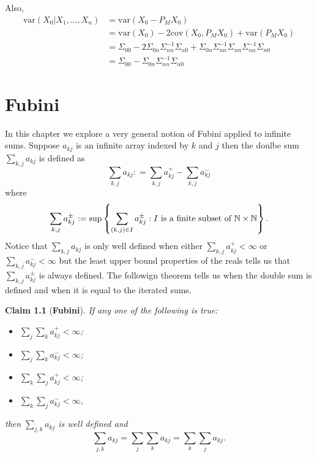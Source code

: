\documentclass[11pt]{report}
\newtheorem{claim}{Claim}
\begin{document}
Also,
\begin{align*}
\text{var}(X_0|X_1,\ldots, X_n)&= \text{var}(X_0- P_MX_0) \\
& = \text{var}(X_0) - 2\text{cov}(X_0, P_MX_0) +  \text{var}(P_MX_0) \\
& = \Sigma_{00} - 2 \Sigma_{0n}\Sigma_{nn}^{-1}\Sigma_{n0} +\Sigma_{0n}\Sigma_{nn}^{-1}\Sigma_{nn}\Sigma_{nn}^{-1}\Sigma_{n0}\\
& = \Sigma_{00} -  \Sigma_{0n}\Sigma_{nn}^{-1}\Sigma_{n0}
\end{align*}

\chapter{Fubini}


In this chapter we explore a very general notion of Fubini applied to infinite sums. Suppose $a_{kj}$ is an infinite array indexed by $k$ and $j$ then the doulbe sum $\sum_{k,j} a_{kj}$ is defined as 
\[ \sum_{k,j} a_{kj}: = \sum_{k,j} a_{kj}^+ - \sum_{k,j} a_{kj}^-\]
where
\[\sum_{k,j} a_{kj}^{\pm} := \sup \left\{ \sum_{(k,j)\in I}a_{kj}^{\pm} : \text{$I$ is a finite subset of $\Bbb N\times \Bbb N$} \right\}. \]
Notice that $\sum_{k,j} a_{kj}$ is only well defined when either $\sum_{k,j} a_{kj}^+< \infty$ or $\sum_{k,j} a_{kj}^-<\infty$ but the least upper bound properties of the reals tells us that $\sum_{k,j} a_{kj}^{\pm}$ is always defined. The followign theorem tells us when the double sum is defined and when it is equal to the iterated sums.

\begin{claim}[{\bf Fubini}]
If any one of the following is true:
\begin{itemize}
\item $\sum_j\sum_ka^+_{kj}<\infty$;
\item $\sum_j\sum_ka^-_{kj}<\infty$;
\item  $\sum_k\sum_ja^+_{kj}<\infty$;
\item  $\sum_k\sum_ja^-_{kj}<\infty$,
\end{itemize}
then $\sum_{j,k}a_{kj}$ is well defined and 
\begin{equation}
\sum_{j,k}a_{kj}=\sum_j\sum_ka_{kj}=\sum_k\sum_ja_{kj}.\nonumber
\end{equation}
\end{claim}
\end{document}
